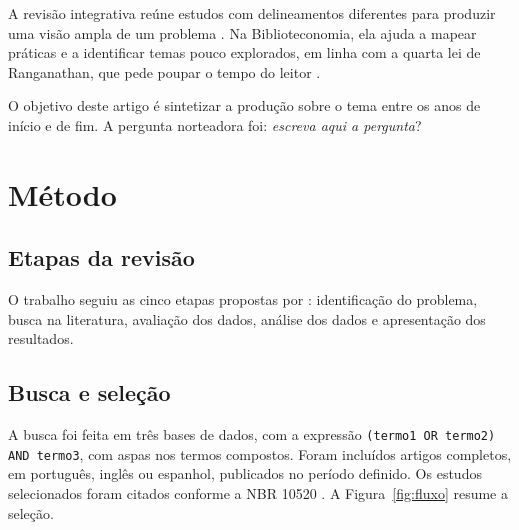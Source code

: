 \documentclass[12pt,a4paper]{article}
\newif\ifinstrucoes
\newcommand{\instrucao}[1]{\ifinstrucoes{\leavevmode\color{gray}\small\itshape #1\par}\fi}
\begin{document}
A revisão integrativa reúne estudos com delineamentos diferentes para produzir uma visão ampla de um problema \cite{whittemore2005}. Na Biblioteconomia, ela ajuda a mapear práticas e a identificar temas pouco explorados, em linha com a quarta lei de Ranganathan, que pede poupar o tempo do leitor \cite{ranganathan1931}.

O objetivo deste artigo é sintetizar a produção sobre o tema entre os anos de início e de fim. A pergunta norteadora foi: \emph{escreva aqui a pergunta}?

\section{Método}
\instrucao{Descreva cada etapa com detalhe suficiente para que outra pessoa repita a busca e obtenha os mesmos estudos.}

\subsection{Etapas da revisão}
O trabalho seguiu as cinco etapas propostas por : identificação do problema, busca na literatura, avaliação dos dados, análise dos dados e apresentação dos resultados.

\subsection{Busca e seleção}
\instrucao{Informe as bases, a data da busca, a expressão de busca com os operadores booleanos e os critérios de inclusão e de exclusão.}
A busca foi feita em três bases de dados, com a expressão \texttt{(termo1 OR termo2) AND termo3}, com aspas nos termos compostos. Foram incluídos artigos completos, em português, inglês ou espanhol, publicados no período definido. Os estudos selecionados foram citados conforme a NBR 10520 \cite{abnt10520}. A Figura~\ref{fig:fluxo} resume a seleção.
\end{document}

